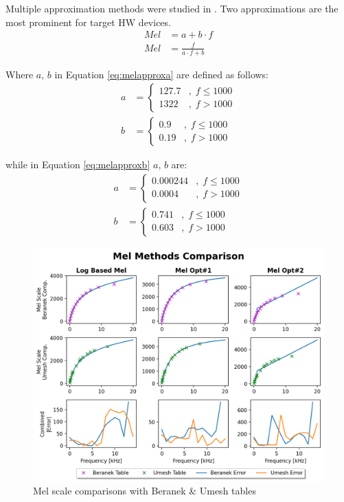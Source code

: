 Multiple approximation methods were studied in \cite{fitmelscale}.
Two approximations are the most prominent for target HW devices.
\begin{align}
    \label{eq:melapproxa} Mel & = a + b \cdot f \\ 
    Mel & = \frac{f}{a \cdot f + b} \label{eq:melapproxb}
\end{align}

Where \(a\), \(b\) in Equation \ref{eq:melapproxa} are defined as follows:
\begin{align}
    a & = \begin{cases}
        127.7   &,\;f \leq 1000 \\
        1322    &,\;f > 1000
    \end{cases} \nonumber \\
    b & = \begin{cases}
        0.9     &,\;f \leq 1000 \\
        0.19    &,\;f > 1000
    \end{cases}
\end{align}

while in Equation \ref{eq:melapproxb} \(a\), \(b\) are:
\begin{align}
    a & = \begin{cases}
        0.000244   &,\;f \leq 1000 \\
        0.0004    &,\;f > 1000
    \end{cases} \nonumber \\
    b & = \begin{cases}
        0.741   &,\;f \leq 1000 \\
        0.603   &,\;f > 1000
    \end{cases}
\end{align}

\begin{figure}[H]
    \centering
    \includegraphics[width=\linewidth]{Scaling/images/mel_methods_comp}
    \caption{Mel scale comparisons with Beranek \& Umesh tables}\label{fig:mel_methods_comp}
\end{figure}

